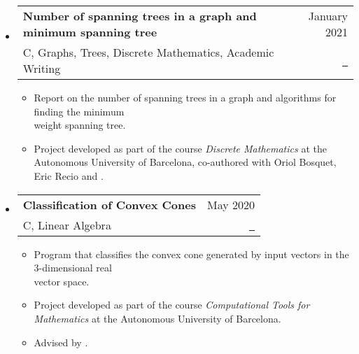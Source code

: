\documentclass[a4paper,11pt]{article}
\makeatletter
\newcommand{\resumeItemListEnd}{\end{itemize}}
\newcommand{\resumeQuadHeading}[4]{
  \item
  \begin{tabular*}{0.96\textwidth}[t]{l@{\extracolsep{\fill}}r}
    \textbf{#1} & \small #2 \\
    \small#3 & \small #4 \\
  \end{tabular*}
}
\newcommand{\resumeHeadingListStart}{
  \begin{itemize}[leftmargin=0.15in, label={}]
}
\newcommand{\resumeHeadingListEnd}{\end{itemize}}
\makeatother
\begin{document}
\resumeHeadingListStart{}
\resumeQuadHeading{Number of spanning trees in a graph and minimum spanning tree}{January 2021}{C, Graphs, Trees, Discrete Mathematics, Academic Writing}{\href{https://github.com/mathUAB/matematica-discreta/blob/main/Treball/Memoria-escrita/main.pdf}{\faFileTextO \ \graydotuline{{Report \scriptsize (in Catalan)}}}}
\begin{itemize}[leftmargin=3em, itemsep=0.1em, topsep=2pt]
  \item \small Report on the number of spanning trees in a graph and algorithms for finding the minimum\\ weight spanning tree.
  \item \small Project developed as part of the course \textit{Discrete Mathematics} at the Autonomous University of Barcelona, co-authored with Oriol Bosquet, Eric Recio and \href{https://github.com/carlosala}{}.
\end{itemize}
\resumeItemListEnd{}

\resumeHeadingListStart{}
\resumeQuadHeading{Classification of Convex Cones}{May 2020}{C, Linear Algebra}{\href{https://github.com/mathUAB/informatica/tree/main/Projecte\%20final}{\faGithub \ \graydotuline{Source code}}}
\begin{itemize}[leftmargin=3em, itemsep=0.1em, topsep=2pt]
  \item \small Program that classifies the convex cone generated by input vectors in the 3-dimensional real\\ vector space.
  \item \small Project developed as part of the course \textit{Computational Tools for Mathematics} at the Autonomous University of Barcelona.
  \item \small Advised by \href{https://mat.uab.cat/geoarit/index.php/people?controller=member&view=member&id=1}{}.
\end{itemize}
\resumeItemListEnd{}



\end{document}
